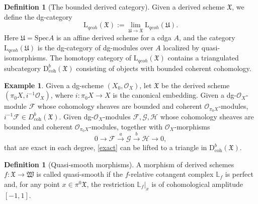 \documentclass{amsart}
\numberwithin{equation}{section}
\newcommand\mc{\mathcal}
\newcommand\mf{\mathfrak}
\newcommand\mb{\mathbb}
\newcommand{\D}{\mathrm{D}}
\theoremstyle{definition}
\newtheorem{definition}[theorem]{Definition}
\newtheorem{example}[theorem]{Example}
\theoremstyle{remark}
\begin{document}
\begin{definition}[The bounded derived category]
  Given a derived scheme $\mf{X}$, we define the dg-category
\begin{equation}
  \label{lim}
  \mathrm{L}_{qcoh}(\mf{X}):=\lim_{\mf{U}\to \mf{X}}\mathrm{L}_{qcoh}(\mf{U}).
\end{equation}
Here $\mf{U}=\mathrm{Spec} A$ is an affine derived scheme for a cdga $A$, and the category $\mathrm{L}_{qcoh}(\mf{U})$ is the dg-category of dg-modules over $A$ localized by quasi-isomorphisms. The homotopy category of $\mathrm{L}_{qcoh}(\mf{X})$ contains a triangulated subcategory
$\D^{b}_{\mathrm{coh}}(\mf{X})$ consisting of objects with bounded coherent cohomology.

\end{definition}
\begin{example}
  \label{m57}
  Given a dg-scheme $(X_{0},\mc{O}_{X})$, let $\mf{X}$ be the derived scheme $(\pi_{0}X, i^{-1}\mc{O}_{X})$, where $i:\pi_{0}X\to X$ is the canonical embedding. Given a dg-$\mc{O}_{X}$-module $\mc{F}$ whose cohomology sheaves are bounded and coherent $\mc{O}_{\pi_{0}X}$-modules, $i^{-1}\mc{F}\in D^{b}_{\mathrm{coh}}(\mf{X})$. Given dg-$\mc{O}_{X}$-modules $\mc{F},\mc{G},\mc{H}$ whose cohomology sheaves are bounded and coherent $\mc{O}_{\pi_{0}X}$-modules, together with $\mc{O}_{X}$-morphisms
  \begin{equation}
    \label{exact}
 0\to \mc{F}\xrightarrow{a}\mc{G}\xrightarrow{b} \mc{H}\to0,
  \end{equation}
  that are exact in each degree, \cref{exact} can be lifted to a triangle in $\D^{b}_{\mathrm{coh}}(\mf{X})$.
\end{example}

\begin{definition}[Quasi-smooth morphisms]
  A morphism of derived schemes $f:\mf{X}\to \mf{W}$ is called quasi-smooth if the $f$-relative cotangent complex $\mb{L}_{f}$ is perfect and, for any point $x\in \pi^{0}\mf{X}$, the restriction $\mb{L}_{f}|_{x}$ is of cohomological amplitude $[-1,1]$.
\end{definition}
\end{document}
